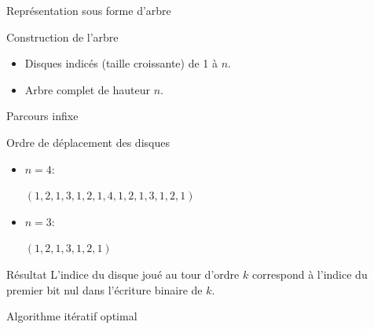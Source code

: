 \documentclass[usenames,dvipsnames,serif,14pt]{beamer}%
\begin{document}
\begin{frame}{Représentation sous forme d'arbre}
  \begin{block}{Construction de l'arbre}
  \begin{center}
  \end{center}
  \begin{itemize}
    \justifying
    \item Disques indicés (taille croissante) de 1 à $n$.
    \item Arbre complet de hauteur $n$.
  \end{itemize}
  \end{block}
\end{frame}

\begin{frame}{Parcours infixe}
  \begin{block}{Ordre de déplacement des disques}
    \begin{itemize}
    \item
    $n=4$:
      \begin{center}
        $(1, 2, 1, 3, 1, 2, 1, 4, 1, 2, 1, 3, 1, 2, 1)$
      \end{center}
    \item
    $n=3$:
      \begin{center}
        $(1, 2, 1, 3, 1, 2, 1)$
      \end{center}
    \end{itemize}
  \end{block}
  \begin{block}{Résultat}
    \justifying
    L'indice du disque joué au tour d'ordre $k$
    correspond à l'indice du premier bit nul dans l'écriture binaire de $k$.
  \end{block}
\end{frame}

\begin{frame}{Algorithme itératif optimal}
  \begin{center}
  \end{center}
\end{frame}
\end{document}
